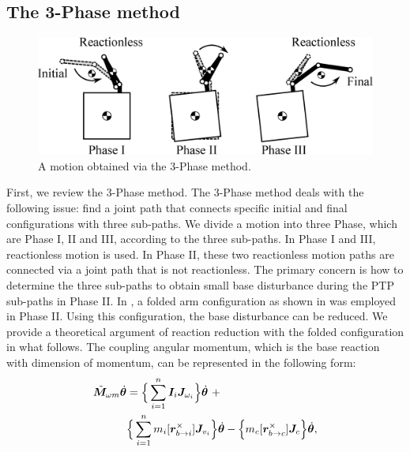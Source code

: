 \subsection{The 3-Phase method}

%
\begin{figure}[t]
  \centering
  \begin{minipage}[h]{0.8\linewidth}
    \centering
    \includegraphics[width=1.0\linewidth]{fig/chapter4/PTP/motion.eps}
  \end{minipage}
  \caption{A motion obtained via the 3-Phase method.}
  \label{fig:3PHASE}
\end{figure}
%
First, we review the 3-Phase method.
The 3-Phase method deals with the following issue:
find a joint path that connects specific initial and final configurations
with three sub-paths.
We divide a motion into three Phase, which are Phase I, II and III, according to the three sub-paths.
In Phase I and III,
reactionless motion is used.
In Phase II,
these two reactionless motion paths are connected via a joint path that is not reactionless.
The primary concern is how to determine the three sub-paths to obtain small base disturbance
during the PTP sub-paths in Phase II.
In \cite{Yoshida1996},
a folded arm configuration as shown in  was employed in Phase II.
Using this configuration, the base disturbance can be reduced.
We provide a theoretical argument of reaction reduction with the folded configuration in what follows.
The coupling angular momentum, which is the base reaction with dimension of momentum,
can be represented in the following form:
%
\begin{align}
  \tilde{\bm{M}}_{\omega m}\dot{\bm{\theta}} &= \Big\{\sum_{i = 1}^{n}\bm{I}_{i}\bm{J}_{\omega_{i}}\Big\}\dot{\bm{\theta}}~ + \notag\\
  &\Big\{\sum_{i=1}^{n}m_{i}[\bm{r}_{b \rightarrow i}^{\times}]\bm{J}_{v_{i}}\Big\}{\dot{\bm{\theta}}} -
  \Big\{m_{c}[\bm{r}_{b \rightarrow c}^{\times}]\bm{J}_{c}\Big\}{\dot{\bm{\theta}}},
  \label{eq:CIM}
\end{align}
